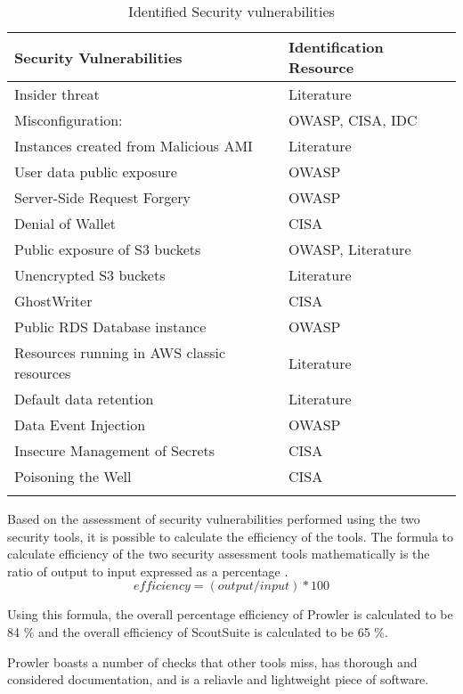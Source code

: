 \begin{longtable}{|p{10cm}|p{2.4cm}|}
    \hline
    \textbf{Security Vulnerabilities} & \textbf{Identification Resource}\\
    \hline
    Insider threat & Literature \cite{91} \\
    \hline
    Misconfiguration: & OWASP, CISA, IDC  \\
    \hline
    Instances created from Malicious AMI & Literature \cite{48} \\
    \hline
    User data public exposure & OWASP \\
    \hline
    Server-Side Request Forgery & OWASP \\
    \hline
    Denial of Wallet & CISA \\
    \hline
    Public exposure of S3 buckets & OWASP, Literature \cite{92}\\
    \hline
    Unencrypted S3 buckets & Literature \cite{93}\\
    \hline
    GhostWriter & CISA \\
    \hline
    Public RDS Database instance & OWASP\\
    \hline
    Resources running in AWS classic resources & Literature \cite{94}\\
    \hline
    Default data retention & Literature \cite{95} \\
    \hline
    Data Event Injection & OWASP \\
    \hline
    Insecure Management of Secrets & CISA\\
    \hline
    Poisoning the Well & CISA \\
    \hline
    \caption{Identified Security vulnerabilities}
    \label{tab:securityvulnerabilitiesandresources}
\end{longtable}

\par Based on the assessment of security vulnerabilities performed using the two security tools, it is possible to calculate the efficiency of the tools.
The formula to calculate efficiency of the two security assessment tools mathematically is the ratio of output to input expressed as a percentage \cite{88}.
\[ efficiency = (output/input) * 100 \]

Using this formula, the overall percentage efficiency of Prowler is calculated to be 84 \% and the overall efficiency of ScoutSuite is calculated to be 65 \%.

\par Prowler boasts a number of checks that other tools miss, has thorough and considered documentation, and is a reliavle and lightweight piece of software.


